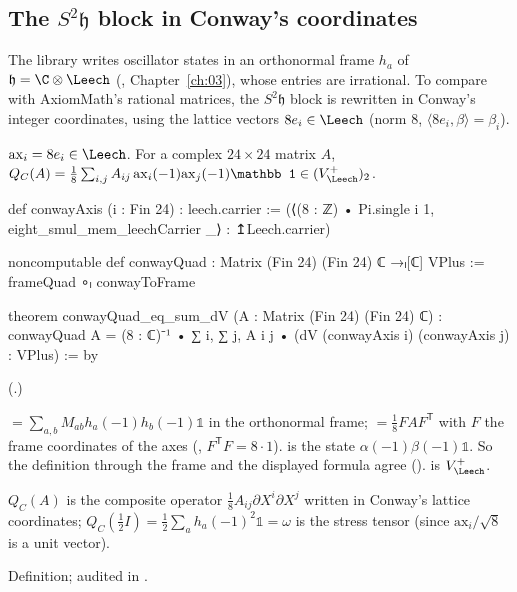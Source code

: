 \subsection{The \texorpdfstring{$S^2\mathfrak h$}{S2h} block in Conway's coordinates}\label{ch21:sec:conway}

The library writes oscillator states in an orthonormal frame $h_a$ of $\mathfrak h=\C\otimes\Leech$
(, Chapter~\ref{ch:03}), whose entries are irrational.  To compare with AxiomMath's
rational matrices, the $S^2\mathfrak h$ block is rewritten in Conway's integer coordinates, using the
lattice vectors $8e_i\in\Leech$ (norm $8$, $\langle8e_i,\beta\rangle=\beta_i$).

\begin{definition}\label{ch21:def:conwayQuad}
$\mathrm{ax}_i=8e_i\in\Leech$.  For a complex $24\times24$ matrix $A$,
$Q_C(A)=\tfrac18\sum_{i,j}A_{ij}\,\mathrm{ax}_i(-1)\mathrm{ax}_j(-1)\mathbb1\in(V_\Leech^+)_2$.
\end{definition}
\begin{leancode}
def conwayAxis (i : Fin 24) : leech.carrier :=
  (⟨(8 : ℤ) • Pi.single i 1, eight_smul_mem_leechCarrier _⟩ : ↥Leech.carrier)
\end{leancode}
\begin{leancode}
noncomputable def conwayQuad : Matrix (Fin 24) (Fin 24) ℂ →ₗ[ℂ] VPlus := frameQuad ∘ₗ conwayToFrame
\end{leancode}
\begin{leancode}
theorem conwayQuad_eq_sum_dV (A : Matrix (Fin 24) (Fin 24) ℂ) :
    conwayQuad A = (8 : ℂ)⁻¹ • ∑ i, ∑ j, A i j • (dV (conwayAxis i) (conwayAxis j) : VPlus) := by
\end{leancode}
(.)
\begin{dictionary}
 $=\sum_{a,b}M_{ab}h_a(-1)h_b(-1)\mathbb1$ in the orthonormal frame;
 $=\tfrac18FAF^{\mathsf T}$ with $F$ the frame coordinates of the axes
(, $F^{\mathsf T}F=8\cdot1$).   is the state $\alpha(-1)\beta(-1)\mathbb1$.
So the definition through the frame and the displayed formula agree ().
 is $V_\Leech^+$.
\end{dictionary}
\begin{physics}
$Q_C(A)$ is the composite operator $\tfrac18A_{ij}\partial X^i\partial X^j$ written in Conway's
lattice coordinates; $Q_C(\tfrac12I)=\tfrac12\sum_a h_a(-1)^2\mathbb1=\omega$ is the stress tensor
(since $\mathrm{ax}_i/\sqrt8$ is a unit vector).
\end{physics}
\begin{status}
Definition; audited in .
\end{status}


